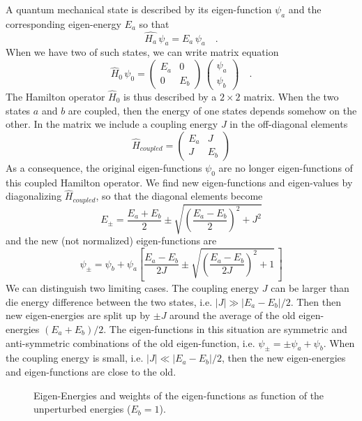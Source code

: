A quantum mechanical state is described by its eigen-function $\psi_a$ and the corresponding eigen-energy $E_a$ so that 
\[
\hat{H_a}  \, \psi_a = E_a  \,\psi_a  \quad .
\]
When we have two of such states, we can  write matrix equation
\[
\hat{H}_0 \, \psi_0 = \begin{pmatrix}  E_a & 0 \\ 0 & E_b \end{pmatrix} \,
	 \begin{pmatrix}  \psi_ a\\ \psi_b\end{pmatrix}  \quad .
\]
The Hamilton operator $\hat{H}_0$ is thus described by a $2 \times 2$ matrix. When the two states $a$ and $b$ are coupled, then the energy of one states depends somehow on the other. In the matrix we include a coupling energy $J$ in the off-diagonal elements
\[
\hat{H}_{coupled}  = \begin{pmatrix}  E_a & J \\ J & E_b \end{pmatrix} 
\]
As a consequence, the original eigen-functions $\psi_0$ are no longer eigen-functions of this coupled Hamilton operator. We find new eigen-functions and eigen-values by diagonalizing $\hat{H}_{coupled}$, so that the diagonal elements become
\[
 E_\pm = \frac{E_a + E_b}{2} \pm \sqrt{ \left( \frac{E_a - E_b}{2} \right)^2 + J^2 }
\]
and the new (not normalized) eigen-functions are
\[
 \psi_{\pm} = \psi_b + \psi_a \left[ \frac{E_a - E_b}{2 J} \pm \sqrt{ \left( \frac{E_a - E_b}{2 J} \right)^2 + 1  } \, \right]
\]
We can distinguish two limiting cases. The coupling energy $J$ can be larger than die energy difference between the two states, i.e. $|J| \gg |E_a - E_b| / 2$. Then then new eigen-energies are split up by $\pm J$ around the average of the old eigen-energies $(E_a + E_b) /2$. The eigen-functions in this situation are symmetric and anti-symmetric combinations of the old eigen-function, i.e. $\psi_\pm = \pm \psi_a + \psi_b$. When the coupling energy is small, i.e. $|J| \ll |E_a - E_b| / 2$, then the new eigen-energies and eigen-functions are close to the old.



\begin{figure}
   
\caption{Eigen-Energies and weights of the eigen-functions as function of the unperturbed energies ($E_b = 1$).}
\end{figure}


